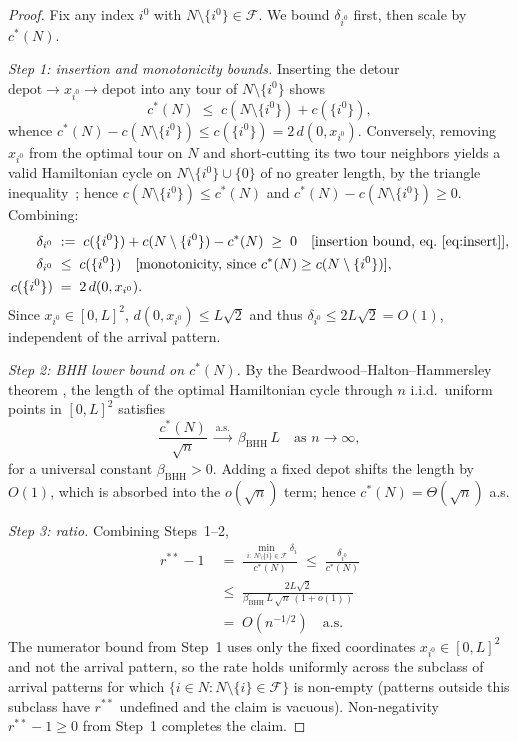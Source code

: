 \documentclass[11pt]{article}
\theoremstyle{plain}
\theoremstyle{definition}
\theoremstyle{remark}
\newcommand{\F}{\mathcal{F}}
\newcommand{\cstar}{c^{\ast}}
\begin{document}
\begin{proof}
Fix any index $i^{0}$ with $N\setminus\{i^{0}\}\in\F$. We bound $\delta_{i^{0}}$ first, then scale by $\cstar(N)$.

\emph{Step 1: insertion and monotonicity bounds.}
Inserting the detour $\text{depot}\to x_{i^{0}}\to\text{depot}$ into any tour of $N\setminus\{i^{0}\}$ shows
\begin{equation}\label{eq:insert}
\cstar(N) \;\le\; c(N\setminus\{i^{0}\}) + c(\{i^{0}\}),
\end{equation}
whence $\cstar(N) - c(N\setminus\{i^{0}\}) \le c(\{i^{0}\}) = 2\,d(0,x_{i^{0}})$.
Conversely, removing $x_{i^{0}}$ from the optimal tour on $N$ and short-cutting its two tour neighbors yields a valid Hamiltonian cycle on $N\setminus\{i^{0}\}\cup\{0\}$ of no greater length, by the triangle inequality~\citep[\S 2.1]{steele1997probability}; hence $c(N\setminus\{i^{0}\}) \le \cstar(N)$ and $\cstar(N) - c(N\setminus\{i^{0}\}) \ge 0$. Combining:
\[
\begin{aligned}
\delta_{i^{0}} & \;:=\; c(\{i^{0}\}) + c(N\setminus\{i^{0}\}) - \cstar(N) \;\ge\; 0 \quad\text{[insertion bound, eq.~\eqref{eq:insert}]}, \\
\delta_{i^{0}} & \;\le\; c(\{i^{0}\}) \quad\text{[monotonicity, since $\cstar(N) \ge c(N\setminus\{i^{0}\})$]}, \\
c(\{i^{0}\}) & \;=\; 2\,d(0,x_{i^{0}}).
\end{aligned}
\]
Since $x_{i^{0}}\in[0,L]^2$, $d(0,x_{i^{0}})\le L\sqrt{2}$ and thus $\delta_{i^{0}} \le 2L\sqrt{2} = O(1)$, independent of the arrival pattern.

\emph{Step 2: BHH lower bound on $\cstar(N)$.} By the Beardwood--Halton--Hammersley theorem \citep{beardwood1959shortest,steele1981subadditive}, the length of the optimal Hamiltonian cycle through $n$ i.i.d.\ uniform points in $[0,L]^2$ satisfies
\[
\frac{\cstar(N)}{\sqrt{n}} \;\xrightarrow{\text{a.s.}}\; \beta_{\mathrm{BHH}}\,L \quad \text{as } n\to\infty,
\]
for a universal constant $\beta_{\mathrm{BHH}}>0$. Adding a fixed depot shifts the length by $O(1)$, which is absorbed into the $o(\sqrt{n})$ term; hence $\cstar(N) = \Theta(\sqrt{n})$ a.s.

\emph{Step 3: ratio.} Combining Steps~1--2,
\[
\begin{aligned}
r^{\ast\ast}-1 & \;=\; \frac{\min_{\,i:\,N\setminus\{i\}\in\F}\delta_i}{\cstar(N)} \;\le\; \frac{\delta_{i^{0}}}{\cstar(N)} \\
& \;\le\; \frac{2L\sqrt{2}}{\beta_{\mathrm{BHH}}\,L\,\sqrt{n}\,(1+o(1))} \\
& \;=\; O(n^{-1/2}) \quad\text{a.s.}
\end{aligned}
\]
The numerator bound from Step~1 uses only the fixed coordinates $x_{i^{0}}\in[0,L]^2$ and not the arrival pattern, so the rate holds uniformly across the subclass of arrival patterns for which $\{i \in N : N\setminus\{i\}\in\F\}$ is non-empty (patterns outside this subclass have $r^{\ast\ast}$ undefined and the claim is vacuous). Non-negativity $r^{\ast\ast}-1\ge 0$ from Step~1 completes the claim.


\end{proof}
\end{document}
